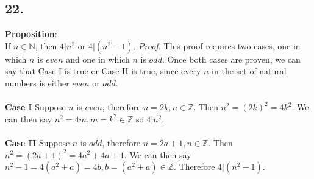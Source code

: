 \documentclass[12pt]{article}
\begin{document}
\hfill\vline\hfill
\begin{minipage}[t]{0.45\textwidth}

\subsection*{22.}
\textbf{Proposition}:  \\If $ n\in \mathbb{N} $, then $  4|n^2 $ or $ 4|(n^2-1)  $.
\newline\textit{Proof.} This proof requires two cases, one in which $ n $ is $ even $ and one in which $ n $ is $ odd $. Once both cases are proven, we can say that Case I is true or Case II is true, since every $ n $ in the set of natural numbers is either $ even $ or $ odd $.
\paragraph{} \textbf{Case I}
\newline
Suppose $ n $ is $ even $, therefore $ n=2k, n\in\mathbb{Z} $. Then $ n^2=(2k)^2=4k^2 $. We can then say $ n^2=4m,m=k^2\in\mathbb{Z} $ so $ 4|n^2 $.

\paragraph{} \textbf{Case II}
\newline
Suppose $ n $ is $ odd $, therefore $ n=2a+1, n\in\mathbb{Z} $. Then $ n^2=(2a+1)^2=4a^2+4a+1 $. We can then say $ n^2-1=4(a^2+a)=4b, b=(a^2+a)\in\mathbb{Z} $. Therefore $ 4|(n^2-1) $.

\end{minipage}
\pagebreak


\end{document}
